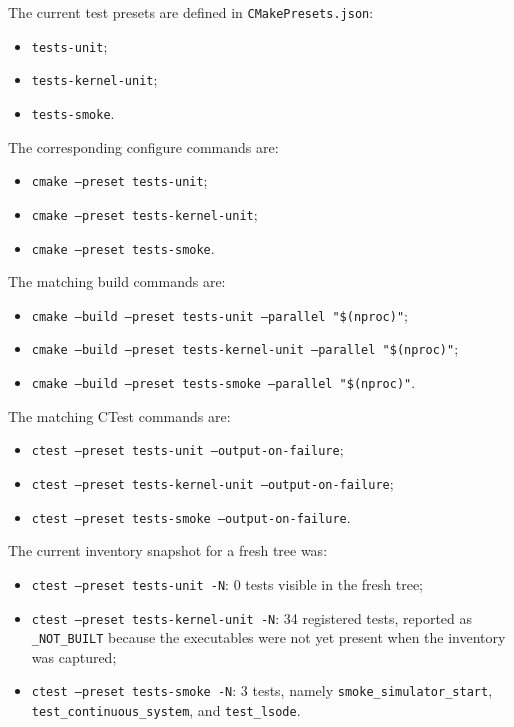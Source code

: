 The current test presets are defined in \texttt{CMakePresets.json}:
\begin{itemize}
\item \texttt{tests-unit};
\item \texttt{tests-kernel-unit};
\item \texttt{tests-smoke}.
\end{itemize}

The corresponding configure commands are:
\begin{itemize}
\item \texttt{cmake --preset tests-unit};
\item \texttt{cmake --preset tests-kernel-unit};
\item \texttt{cmake --preset tests-smoke}.
\end{itemize}

The matching build commands are:
\begin{itemize}
\item \texttt{cmake --build --preset tests-unit --parallel "\$(nproc)"};
\item \texttt{cmake --build --preset tests-kernel-unit --parallel "\$(nproc)"};
\item \texttt{cmake --build --preset tests-smoke --parallel "\$(nproc)"}.
\end{itemize}

The matching CTest commands are:
\begin{itemize}
\item \texttt{ctest --preset tests-unit --output-on-failure};
\item \texttt{ctest --preset tests-kernel-unit --output-on-failure};
\item \texttt{ctest --preset tests-smoke --output-on-failure}.
\end{itemize}

The current inventory snapshot for a fresh tree was:
\begin{itemize}
\item \texttt{ctest --preset tests-unit -N}: 0 tests visible in the fresh tree;
\item \texttt{ctest --preset tests-kernel-unit -N}: 34 registered tests,
reported as \texttt{\_NOT\_BUILT} because the executables were not yet present
when the inventory was captured;
\item \texttt{ctest --preset tests-smoke -N}: 3 tests, namely
\texttt{smoke\_simulator\_start}, \texttt{test\_continuous\_system}, and
\texttt{test\_lsode}.
\end{itemize}

